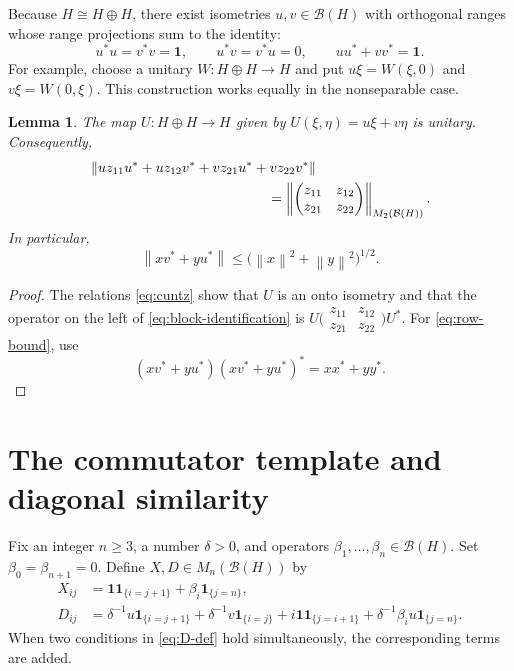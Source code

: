 \documentclass[11pt]{amsart}
\numberwithin{equation}{section}
\newtheorem{lemma}[lemma]{Lemma}
\theoremstyle{remark}
\newcommand{\one}{\mathbf 1}
\newcommand{\norm}[1]{\left\lVert #1\right\rVert}
\newcommand{\ind}[1]{\mathbf 1_{\{#1\}}}
\begin{document}
Because $H\cong H\oplus H$, there exist isometries $u,v\in\mathcal B(H)$ with
orthogonal ranges whose range projections sum to the identity:
\begin{equation}\label{eq:cuntz}
 u^*u=v^*v=\one,
 \qquad u^*v=v^*u=0,
 \qquad uu^*+vv^*=\one.
\end{equation}
For example, choose a unitary $W:H\oplus H\to H$ and put
$u\xi=W(\xi,0)$ and $v\xi=W(0,\xi)$.  This construction works equally in the
nonseparable case.

\begin{lemma}\label{lem:cuntz-block}
The map $U:H\oplus H\to H$ given by
$U(\xi,\eta)=u\xi+v\eta$ is unitary.  Consequently,
\begin{align}
&\norm{u z_{11}u^*+u z_{12}v^*+v z_{21}u^*+v z_{22}v^*}
\notag\\
&\hspace{45mm}=
\norm{
\begin{pmatrix}
z_{11}&z_{12}\\z_{21}&z_{22}
\end{pmatrix}}_{M_2(\mathcal B(H))}.
\label{eq:block-identification}
\end{align}
In particular,
\begin{equation}\label{eq:row-bound}
 \norm{xv^*+yu^*}
 \leq\bigl(\norm x^2+\norm y^2\bigr)^{1/2}.
\end{equation}
\end{lemma}

\begin{proof}
The relations \eqref{eq:cuntz} show that $U$ is an onto isometry and that the
operator on the left of \eqref{eq:block-identification} is
$U\bigl(\begin{smallmatrix}z_{11}&z_{12}\\z_{21}&z_{22}\end{smallmatrix}\bigr)U^*$.
For \eqref{eq:row-bound}, use
\[
 (xv^*+yu^*)(xv^*+yu^*)^*=xx^*+yy^*.
\]
\end{proof}

\section{The commutator template and diagonal similarity}

Fix an integer $n\geq3$, a number $\delta>0$, and operators
$\beta_1,\ldots,\beta_n\in\mathcal B(H)$.  Set
$\beta_0=\beta_{n+1}=0$.  Define $X,D\in M_n(\mathcal B(H))$ by
\begin{align}
 X_{ij}
 &=\one\ind{i=j+1}+\beta_i\ind{j=n},
 \label{eq:X-def}\\
 D_{ij}
 &=\delta^{-1}u\ind{i=j+1}
 +\delta^{-1}v\ind{i=j}
 +i\one\ind{j=i+1}
 +\delta^{-1}\beta_i u\ind{j=n}.
 \label{eq:D-def}
\end{align}
When two conditions in \eqref{eq:D-def} hold simultaneously, the corresponding
terms are added.
\end{document}
